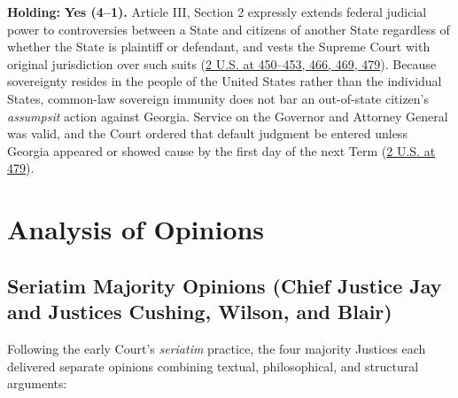 \documentclass[12pt]{article}
\begin{document}
\textbf{Holding:} \textbf{Yes (4--1).} Article III, Section 2 expressly extends federal judicial power to controversies between a State and citizens of another State regardless of whether the State is plaintiff or defendant, and vests the Supreme Court with original jurisdiction over such suits (\href{https://supreme.justia.com/cases/federal/us/2/419/}{2 U.S. at 450--453, 466, 469, 479}). Because sovereignty resides in the people of the United States rather than the individual States, common-law sovereign immunity does not bar an out-of-state citizen's \emph{assumpsit} action against Georgia. Service on the Governor and Attorney General was valid, and the Court ordered that default judgment be entered unless Georgia appeared or showed cause by the first day of the next Term (\href{https://supreme.justia.com/cases/federal/us/2/419/}{2 U.S. at 479}).

\section{Analysis of Opinions}
\subsection{Seriatim Majority Opinions (Chief Justice Jay and Justices Cushing, Wilson, and Blair)}

Following the early Court's \emph{seriatim} practice, the four majority Justices each delivered separate opinions combining textual, philosophical, and structural arguments:
\end{document}
